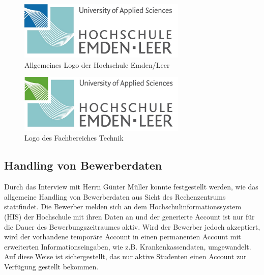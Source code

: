 \begin{figure}[h!]
	\centering
	\includegraphics[width=8cm]{kapitel/gruppe2/bilder/hs_logo_allgemein}
	\caption{Allgemeines Logo der Hochschule Emden/Leer}
	\label{fig_logo_allgemein}
\end{figure}

\begin{figure}[h!]
	\centering
	\includegraphics[width=8cm]{kapitel/gruppe2/bilder/hs_logo_technik}
	\caption{Logo des Fachbereiches Technik}
	\label{fig_logo_fb_technik}
\end{figure}

\subsection{Handling von Bewerberdaten}
Durch das Interview mit Herrn Günter Müller konnte festgestellt werden, wie das allgemeine Handling von Bewerberdaten aus Sicht des Rechenzentrums stattfindet. 
Die Bewerber melden sich an dem Hochschulinformationssystem (HIS) der Hochschule mit ihren Daten an und der generierte Account ist nur für die Dauer des Bewerbungszeitraumes aktiv. Wird der Bewerber jedoch akzeptiert, wird der vorhandene temporäre Account in einen permanenten Account mit erweiterten Informationseingaben, wie z.B. Krankenkassendaten, umgewandelt. Auf diese Weise ist sichergestellt, das nur aktive Studenten einen Account zur Verfügung gestellt bekommen.